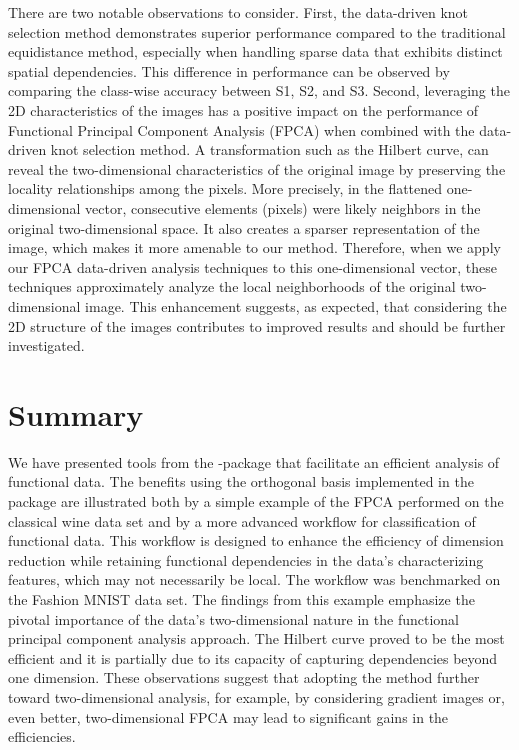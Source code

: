 There are two notable observations to consider. First, the data-driven knot selection method demonstrates superior performance compared to the traditional equidistance method, especially when handling sparse data that exhibits distinct spatial dependencies. This difference in performance can be observed by comparing the class-wise accuracy between S1, S2, and S3. Second, leveraging the 2D characteristics of the images has a positive impact on the performance of Functional Principal Component Analysis (FPCA) when combined with the data-driven knot selection method. A transformation such as the Hilbert curve, can reveal the two-dimensional characteristics of the original image by preserving the locality relationships among the pixels. More precisely, in the flattened one-dimensional vector, consecutive elements (pixels) were likely neighbors in the original two-dimensional space. It also creates a sparser representation of the image, which makes it more amenable to our method. Therefore, when we apply our FPCA data-driven analysis techniques to this one-dimensional vector, these techniques approximately analyze the local neighborhoods of the original two-dimensional image. This enhancement suggests, as expected, that considering the 2D structure of the images contributes to improved results and should be further investigated.

\vspace{-.13cm}
\section{Summary}
\vspace{-.22cm}
We have presented tools from the -package that facilitate an efficient analysis of functional data. The benefits using the orthogonal basis implemented in the package are illustrated both by a simple example of the FPCA performed on the classical wine data set and by a more advanced workflow for classification of functional data. 
This workflow is designed to enhance the efficiency of dimension reduction while retaining functional dependencies in the data's characterizing features, which may not necessarily be local. 
The workflow was benchmarked on the Fashion MNIST data set. 
The findings from this example emphasize the pivotal importance of the data's two-dimensional nature in the functional principal component analysis approach. 
The Hilbert curve proved to be the most efficient and it is partially due to its capacity of capturing dependencies beyond one dimension. 
These observations suggest that adopting the method further toward two-dimensional analysis, for example, by considering gradient images or, even better, two-dimensional FPCA may lead to significant gains in the efficiencies.



